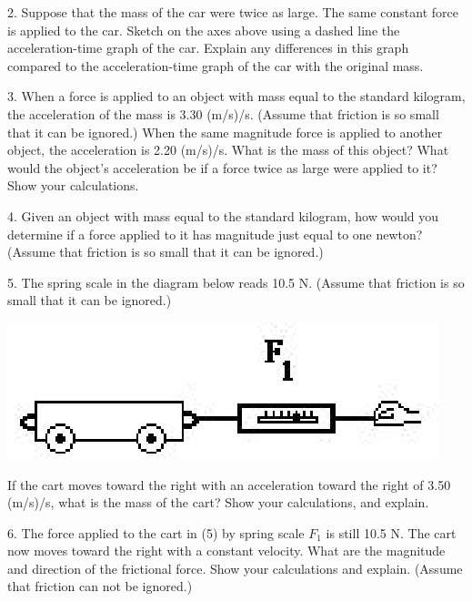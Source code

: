 2. Suppose that the mass of the car were twice as large. The same constant force
is applied to the car. Sketch on the axes above using a dashed line the acceleration-time
graph of the car. Explain any differences in this graph compared to the acceleration-time
graph of the car with the original mass.
\vspace{20mm}

3. When a force is applied to an object with mass equal to the standard kilogram,
the acceleration of the mass is 3.30 (m/s)/s. (Assume that friction is so small
that it can be ignored.) When the same magnitude force is applied to another
object, the acceleration is 2.20 (m/s)/s. What is the mass of this object? What
would the object's acceleration be if a force twice as large were applied to
it? Show your calculations.
\vspace{20mm}

4. Given an object with mass equal to the standard kilogram, how would you determine
if a force applied to it has magnitude just equal to one newton? (Assume that
friction is so small that it can be ignored.)
\vspace{20mm}

5. The spring scale in the diagram below reads 10.5 N. (Assume that friction
is so small that it can be ignored.)

\vspace{0.3cm}
{\par\centering \includegraphics{combining/combining_fig2.eps} \par}
\vspace{0.3cm}

If the cart moves toward the right with an acceleration toward the right of
3.50 (m/s)/s, what is the mass of the cart? Show your calculations, and explain.
\vspace{20mm}

6. The force applied to the cart in (5) by spring scale \( F_{1} \) is still
10.5 N. The cart now moves toward the right with a constant velocity. What are
the magnitude and direction of the frictional force. Show your calculations
and explain. (Assume that friction can not be ignored.)
\vspace{20mm}

